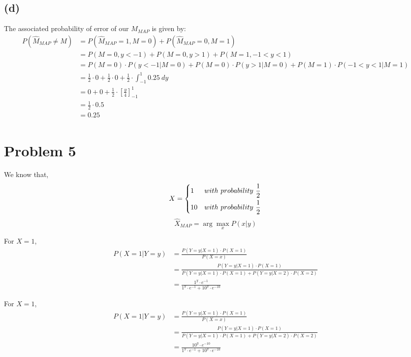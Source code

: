 \documentclass{article}
\begin{document}
\subsection*{(d)}
	The associated probability of error of our $\hat M_{MAP}$ is given by:
	$$ \begin{aligned}
		P(\hat M_{MAP} \neq M) &= P(\hat M_{MAP} = 1, M = 0)+P(\hat M_{MAP} = 0, M = 1) \\
		&= P(M=0, y<-1) + P(M=0, y>1) + P(M=1, -1<y<1) \\
		&= P(M=0) \cdot P(y<-1 | M=0) + P(M=0) \cdot P(y>1 | M=0) + P(M=1) \cdot P(-1<y<1 | M=1) \\
		&= \frac{1}{2} \cdot 0 + \frac{1}{2} \cdot 0 + \frac{1}{2} \cdot  \int_{-1}^{1} 0.25 \ dy \\
		&= 0 + 0 + \frac{1}{2} \cdot \left[ \frac{y}{4}\right]_{-1}^{1} \\
		&= \frac{1}{2} \cdot 0.5 \\
		&= 0.25 \\
	\end{aligned}
	$$

\section*{Problem 5}
	We know that,
	$$ X = \begin{dcases}
		1 & with\ probability\ \frac{1}{2} \\
		10 & with\ probability\ \frac{1}{2}
		\end{dcases}
	$$
	$$ \hat{X}_{MAP} = \arg \max_x P(x|y) $$
\linebreak
	
	For $X=1$,
	$$ \begin{aligned}
		P(X=1 | Y=y) &= \frac{P(Y=y|X=1)\cdot P(X=1)}{P(X=x)} \\
		 	&= \frac{P(Y=y|X=1)\cdot P(X=1)}{P(Y=y|X=1)\cdot P(X=1)+P(Y=y|X=2)\cdot P(X=2)} \\
			&= \frac{1^{y} \cdot e^{-1}}{1^{y} \cdot e^{-1}+10^{y} \cdot e^{-10}}
	\end{aligned}
	$$
\linebreak
	
	For $X=1$,
	$$ \begin{aligned}
		P(X=1 | Y=y) &= \frac{P(Y=y|X=1)\cdot P(X=1)}{P(X=x)} \\
		 	&= \frac{P(Y=y|X=1)\cdot P(X=1)}{P(Y=y|X=1)\cdot P(X=1)+P(Y=y|X=2)\cdot P(X=2)} \\
			&= \frac{10^{y} \cdot e^{-10}}{1^{y} \cdot e^{-1}+10^{y} \cdot e^{-10}}
	\end{aligned}
	$$
\linebreak
\end{document}
